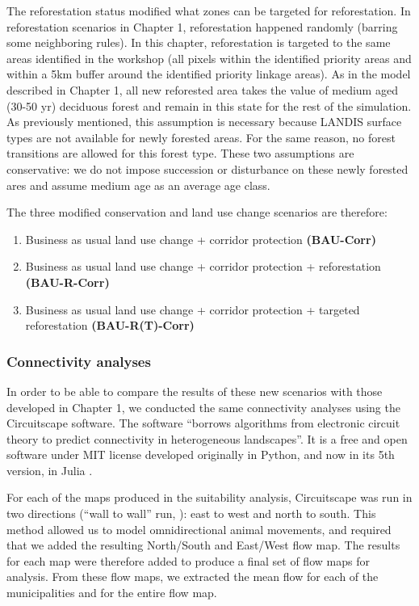 The reforestation status modified what zones can be targeted for reforestation. In reforestation scenarios in Chapter 1, reforestation happened randomly (barring some neighboring rules). In this chapter, reforestation is targeted to the same areas identified in the workshop (all pixels within the identified priority areas and within a 5km buffer around the identified priority linkage areas). As in the model described in Chapter 1, all new reforested area takes the value of medium aged (30-50 yr) deciduous forest and remain in this state for the rest of the simulation. As previously mentioned, this assumption is necessary because LANDIS surface types are not available for newly forested areas. For the same reason, no forest transitions are allowed for this forest type. These two assumptions are conservative:  we do not impose succession or disturbance on these newly forested ares and assume medium age as an average age class.

The three modified conservation and land use change scenarios are therefore:
\begin{enumerate}
  \item Business as usual land use change + corridor protection \textbf{(BAU-Corr)}
 \item Business as usual land use change + corridor protection + reforestation \textbf{(BAU-R-Corr)}
 \item Business as usual land use change + corridor protection + targeted reforestation \textbf{(BAU-R(T)-Corr)} \\
\end{enumerate}

\subsubsection{Connectivity analyses}

In order to be able to compare the results of these new scenarios with those developed in Chapter 1, we conducted the same connectivity analyses using the Circuitscape software. The software “borrows algorithms from electronic circuit theory to predict connectivity in heterogeneous landscapes''. It is a free and open software under MIT license developed originally in Python, and now in its 5th version, in Julia \citep{circuitjulia}.

For each of the maps produced in the suitability analysis, Circuitscape was run in two directions (“wall to wall” run, \cite{mcrae_conserving_2016}): east to west and north to south. This method allowed us to model omnidirectional animal movements, and required that we added the resulting North/South and East/West flow map. The results for each map were therefore added to produce a final set of flow maps for analysis. From these flow maps, we extracted the mean flow for each of the municipalities and for the entire flow map. 

